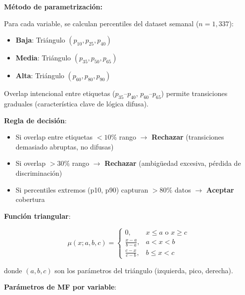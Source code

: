 \documentclass[12pt,letterpaper,twoside]{report}
\begin{document}
\begin{calculobox}
\begin{estadisticobox}
\textbf{Método de parametrización:}

Para cada variable, se calculan percentiles del dataset semanal ($n=1,337$):
\begin{itemize}[noitemsep]
    \item \textbf{Baja}: Triángulo $(p_{10}, p_{25}, p_{40})$
    \item \textbf{Media}: Triángulo $(p_{35}, p_{50}, p_{65})$
    \item \textbf{Alta}: Triángulo $(p_{60}, p_{80}, p_{90})$
\end{itemize}

Overlap intencional entre etiquetas ($p_{35}$--$p_{40}$, $p_{60}$--$p_{65}$) permite transiciones graduales (característica clave de lógica difusa).
\end{estadisticobox}

\begin{reglabox}
\textbf{Regla de decisión}:

\begin{itemize}[noitemsep]
    \item Si overlap entre etiquetas $< 10\%$ rango $\to$ \textbf{Rechazar} (transiciones demasiado abruptas, no difusas)
    \item Si overlap $> 30\%$ rango $\to$ \textbf{Rechazar} (ambigüedad excesiva, pérdida de discriminación)
    \item Si percentiles extremos (p10, p90) capturan $> 80\%$ datos $\to$ \textbf{Aceptar} cobertura
\end{itemize}
\end{reglabox}

\begin{calculobox}
\textbf{Función triangular}:

\begin{equation}
\mu(x; a, b, c) = 
\begin{cases}
0, & x \leq a \text{ o } x \geq c \\
\frac{x-a}{b-a}, & a < x < b \\
\frac{c-x}{c-b}, & b \leq x < c
\end{cases}
\end{equation}

donde $(a, b, c)$ son los parámetros del triángulo (izquierda, pico, derecha).

\textbf{Parámetros de MF por variable}:


\end{calculobox}
\end{calculobox}
\end{document}
